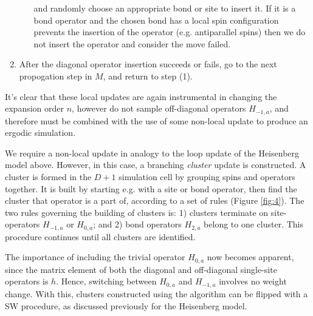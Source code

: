 \documentclass[vecphys]{svmult}
\begin{document}
\begin{enumerate}
\begin{enumerate}
and randomly choose an appropriate bond or site to insert it.
If it is a bond operator and the chosen bond has a local spin configuration prevents the insertion of the operator (e.g. antiparallel spins) then we do not insert the operator and consider the move failed.
\end{enumerate}
\item After the diagonal operator insertion succeeds or fails,  go to the next propogation step in $M$, and return to step (1).
\end{enumerate}
It's clear that these local updates are again instrumental in changing the expansion order $n$, however do not sample off-diagonal operators $H_{-1,a}$, and therefore must be combined with the use of some non-local update to produce an ergodic simulation.

We require a non-local update in analogy to the loop update of the Heisenberg model above.  However, in this case, a branching {\it cluster} update is constructed.  A cluster is formed in the $D+1$ simulation cell by grouping spins and operators together.  It is built by starting e.g. with a site or bond operator, then find the cluster that operator is a part of, according to a set of rules (Figure \ref{fig:4}).  The two rules governing the building of clusters is: 1) clusters terminate on site-operators $H_{-1,a}$ or $H_{0,a}$; and 2) bond operators $H_{2,a}$ belong to one cluster. This procedure continues until all clusters are identified.

The importance of including the trivial operator $H_{0,a}$ now becomes apparent, since the matrix element of both the diagonal and off-diagonal single-site operators is $h$.  Hence, switching between $H_{0,a}$ and $H_{-1,a}$ involves no weight change.  With this, clusters constructed using the algorithm can be flipped with a SW procedure, as discussed previously for the Heisenberg model.
\end{document}
